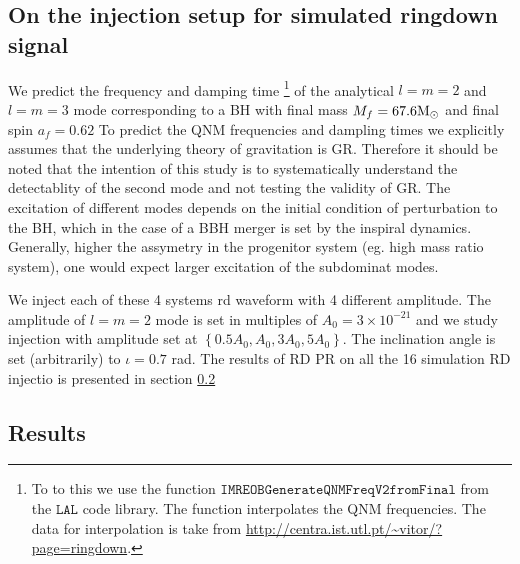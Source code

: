 \subsection{On the injection setup for simulated ringdown signal}
\label{sec:details-of-ana-RD}
We predict the frequency and damping time \footnote{To to this we use the function $\texttt{IMREOBGenerateQNMFreqV2fromFinal}$ from the $\texttt{LAL}$ code library. The function interpolates the QNM frequencies. The data for interpolation is take from \url{http://centra.ist.utl.pt/~vitor/?page=ringdown}.} of the analytical $l=m=2$ and $l=m=3$ mode corresponding to a BH with final mass $M_{f}=67.6 \mathrm{M}_\odot$ and final spin $a_{f}=0.62$ To predict the QNM frequencies and dampling times we explicitly assumes that the underlying theory of gravitation is GR. Therefore it should be noted that the intention of this study is to systematically understand the detectablity of the second mode and not testing the validity of GR. The excitation of different modes depends on the initial condition of perturbation to the BH, which in the case of a BBH merger is set by the inspiral dynamics. Generally, higher the assymetry in the progenitor system (eg. high mass ratio system), one would expect larger excitation of the subdominat modes. 

We inject each of these 4 systems rd waveform with 4 different amplitude. The amplitude of $l=m=2$ mode is set in multiples of $A_{0}= 3 \times 10^{-21}$ and we study injection with amplitude set at $\left\lbrace 0.5 A_{0}, A_{0}, 3A_{0}, 5A_{0}\right\rbrace $. The inclination angle is set (arbitrarily) to $\iota=0.7$ rad. The results of RD PR on all the 16 simulation RD injectio is presented in section \ref{sec:result-ana-pe}


\subsection{Results}
\label{sec:result-ana-pe}


